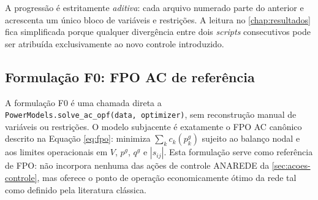 \begin{table}[!h]
\captionsetup{width=15cm}
\end{table}

A progressão é estritamente \emph{aditiva}: cada arquivo numerado parte do anterior e acrescenta um único bloco de variáveis e restrições. A leitura no \autoref{chap:resultados} fica simplificada porque qualquer divergência entre dois \textit{scripts} consecutivos pode ser atribuída exclusivamente ao novo controle introduzido.

\subsection{Formulação F0: FPO AC de referência}
\label{subsec:f14}

A formulação F0 é uma chamada direta a \texttt{PowerModels.\allowbreak solve\_ac\_opf(data,\allowbreak\ optimizer)}, sem reconstrução manual de variáveis ou restrições. O modelo subjacente é exatamente o FPO AC canônico descrito na Equação \eqref{eq:fpo}: minimiza $\sum_k c_k(p^g_k)$ sujeito ao balanço nodal e aos limites operacionais em $V$, $p^g$, $q^g$ e $|s_{ij}|$. Esta formulação serve como referência de FPO: não incorpora nenhuma das ações de controle ANAREDE da \autoref{sec:acoes-controle}, mas oferece o ponto de operação economicamente ótimo da rede tal como definido pela literatura clássica.

